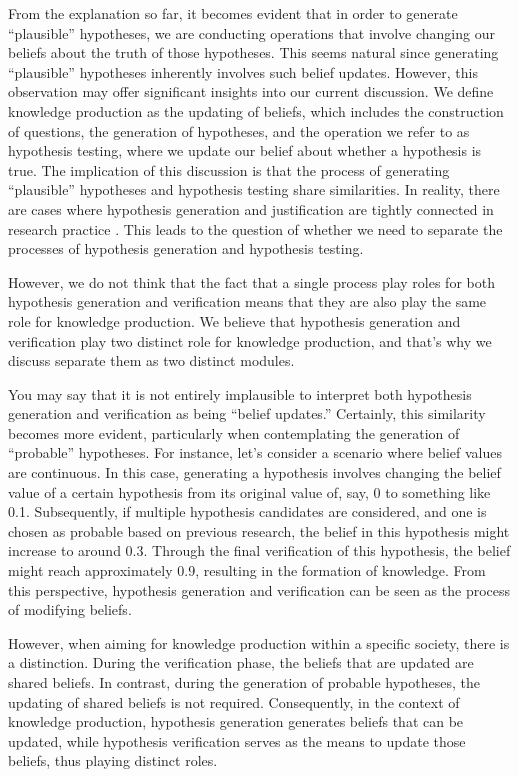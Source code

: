 From the explanation so far, it becomes evident that in order to generate ``plausible'' hypotheses, we are conducting operations that involve changing our beliefs about the truth of those hypotheses. This seems natural since generating ``plausible'' hypotheses inherently involves such belief updates. However, this observation may offer significant insights into our current discussion. We define knowledge production as the updating of beliefs, which includes the construction of questions, the generation of hypotheses, and the operation we refer to as hypothesis testing, where we update our belief about whether a hypothesis is true. The implication of this discussion is that the process of generating ``plausible'' hypotheses and hypothesis testing share similarities. In reality, there are cases where hypothesis generation and justification are tightly connected in research practice \cite{arabatzis2006inextricability}. This leads to the question of whether we need to separate the processes of hypothesis generation and hypothesis testing.

However, we do not think that the fact that a single process play roles for both hypothesis generation and verification means that they are also play the same role for knowledge production. We believe that hypothesis generation and verification play two distinct role for knowledge production, and that's why we discuss separate them as two distinct modules.

You may say that it is not entirely implausible to interpret both hypothesis generation and verification as being ``belief updates.'' Certainly, this similarity becomes more evident, particularly when contemplating the generation of ``probable'' hypotheses. For instance, let's consider a scenario where belief values are continuous. In this case, generating a hypothesis involves changing the belief value of a certain hypothesis from its original value of, say, 0 to something like 0.1. Subsequently, if multiple hypothesis candidates are considered, and one is chosen as probable based on previous research, the belief in this hypothesis might increase to around 0.3. Through the final verification of this hypothesis, the belief might reach approximately 0.9, resulting in the formation of knowledge. From this perspective, hypothesis generation and verification can be seen as the process of modifying beliefs.

However, when aiming for knowledge production within a specific society, there is a distinction. During the verification phase, the beliefs that are updated are shared beliefs. In contrast, during the generation of probable hypotheses, the updating of shared beliefs is not required. Consequently, in the context of knowledge production, hypothesis generation generates beliefs that can be updated, while hypothesis verification serves as the means to update those beliefs, thus playing distinct roles.

